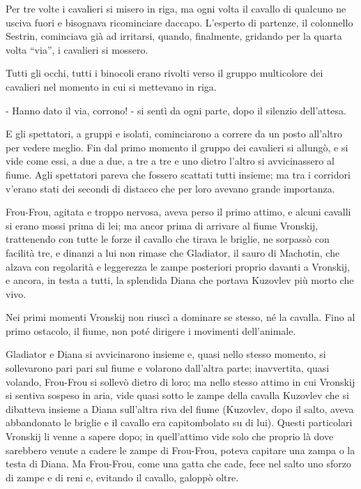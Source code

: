 Per tre volte i cavalieri si misero in riga, ma ogni volta il cavallo di qualcuno ne usciva fuori e bisognava ricominciare daccapo. L'esperto di partenze, il colonnello Sestrin, cominciava già ad irritarsi, quando, finalmente, gridando per la quarta volta ``via'', i cavalieri si mossero. 

Tutti gli occhi, tutti i binocoli erano rivolti verso il gruppo multicolore dei cavalieri nel momento in cui si mettevano in riga. 

- Hanno dato il via, corrono! - si sentì da ogni parte, dopo il silenzio dell'attesa. 

E gli spettatori, a gruppi e isolati, cominciarono a correre da un posto all'altro per vedere meglio. Fin dal primo momento il gruppo dei cavalieri si allungò, e si vide come essi, a due a due, a tre a tre e uno dietro l'altro si avvicinassero al fiume. Agli spettatori pareva che fossero scattati tutti insieme; ma tra i corridori v'erano stati dei secondi di distacco che per loro avevano grande importanza. 

Frou-Frou, agitata e troppo nervosa, aveva perso il primo attimo, e alcuni cavalli si erano mossi prima di lei; ma ancor prima di arrivare al fiume Vronskij, trattenendo con tutte le forze il cavallo che tirava le briglie, ne sorpassò con facilità tre, e dinanzi a lui non rimase che Gladiator, il sauro di Machotin, che alzava con regolarità e leggerezza le zampe posteriori proprio davanti a Vronskij, e ancora, in testa a tutti, la splendida Diana che portava Kuzovlev più morto che vivo. 

Nei primi momenti Vronskij non riuscì a dominare se stesso, né la cavalla. Fino al primo ostacolo, il fiume, non poté dirigere i movimenti dell'animale. 

Gladiator e Diana si avvicinarono insieme e, quasi nello stesso momento, si sollevarono pari pari sul fiume e volarono dall'altra parte; inavvertita, quasi volando, Frou-Frou si sollevò dietro di loro; ma nello stesso attimo in cui Vronskij si sentiva sospeso in aria, vide quasi sotto le zampe della cavalla Kuzovlev che si dibatteva insieme a Diana sull'altra riva del fiume (Kuzovlev, dopo il salto, aveva abbandonato le briglie e il cavallo era capitombolato su di lui). Questi particolari Vronskij li venne a sapere dopo; in quell'attimo vide solo che proprio là dove sarebbero venute a cadere le zampe di Frou-Frou, poteva capitare una zampa o la testa di Diana. Ma Frou-Frou, come una gatta che cade, fece nel salto uno sforzo di zampe e di reni e, evitando il cavallo, galoppò oltre. 

